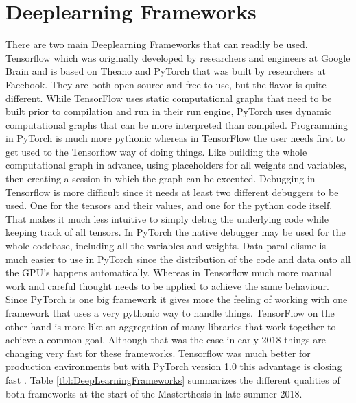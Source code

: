 \section{Deeplearning Frameworks}

There are two main Deeplearning Frameworks that can readily be used. Tensorflow \cite{tensorflow} which was originally developed by researchers and engineers at Google Brain and is based on Theano and PyTorch \cite{pytorch} that was built by researchers at Facebook. They are both open source and free to use, but the flavor is quite different. While TensorFlow uses static computational graphs that need to be built prior to compilation and run in their run engine, PyTorch uses dynamic computational graphs that can be more interpreted than compiled. Programming in PyTorch is much more pythonic whereas in TensorFlow the user needs first to get used to the Tensorflow way of doing things. Like building the whole computational graph in advance, using placeholders for all weights and variables, then creating a session in which the graph can be executed. Debugging in Tensorflow is more difficult since it needs at least two different debuggers to be used. One for the tensors and their values, and one for the python code itself. That makes it much less intuitive to simply debug the underlying code while keeping track of all tensors. In PyTorch the native debugger may be used for the whole codebase, including all the variables and weights. Data parallelisme is much easier to use in PyTorch since the distribution of the code and data onto all the GPU's happens automatically. Whereas in Tensorflow much more manual work and careful thought needs to be applied to achieve the same behaviour. Since PyTorch is one big framework it gives more the feeling of working with one framework that uses a very pythonic way to handle things. TensorFlow on the other hand is more like an aggregation of many libraries that work together to achieve a common goal. Although that was the case in early 2018 things are changing very fast for these frameworks. Tensorflow was much better for production environments but with PyTorch version 1.0 this advantage is closing fast \cite{pytorchOnePointZero}. Table \ref{tbl:DeepLearningFrameworks} summarizes the different qualities of  both frameworks at the start of the Masterthesis in late summer 2018. \\


